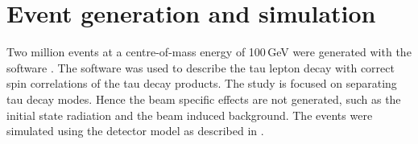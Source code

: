 \section{Event generation and simulation}
\label{sec:tauDecayModes}


Two million \eeToTauTau events at a centre-of-mass energy of 100\,GeV were generated with the \WHIZARD software \cite{whizard}.  The \TAUOLA software \cite{Jadach:1993hs} was used to describe the tau lepton decay with correct spin correlations of the tau decay products. The study is focused on separating tau decay modes. Hence the beam specific effects are not generated, such as the initial state radiation and the beam induced background. The \eeToTauTau events were simulated using the \ILD detector model as described in .




